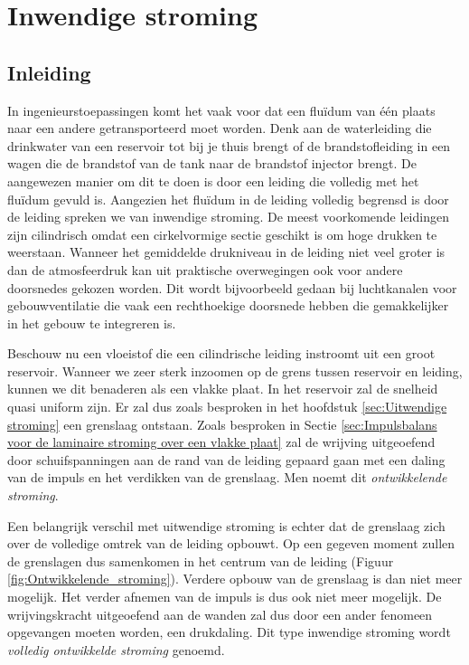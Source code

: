 \chapter{Inwendige stroming}
\label{sec:Inwendige stroming}

	\section{Inleiding}
	\label{sec:Inwendige stroming Inleiding}
In ingenieurstoepassingen komt het vaak voor dat een fluïdum van één plaats naar een andere getransporteerd moet worden. Denk aan de waterleiding die drinkwater van een reservoir tot bij je thuis brengt of de brandstofleiding in een wagen die de brandstof van de tank naar de brandstof injector brengt. De aangewezen manier om dit te doen is door een leiding die volledig met het fluïdum gevuld is. Aangezien het fluïdum in de leiding volledig begrensd is door de leiding spreken we van inwendige stroming. De meest voorkomende leidingen zijn cilindrisch omdat een cirkelvormige sectie geschikt is om hoge drukken te weerstaan. Wanneer het gemiddelde drukniveau in de leiding niet veel groter is dan de atmosfeerdruk kan uit praktische overwegingen ook voor andere doorsnedes gekozen worden. Dit wordt bijvoorbeeld gedaan bij luchtkanalen voor gebouwventilatie die vaak een rechthoekige doorsnede hebben die gemakkelijker in het gebouw te integreren is.

Beschouw nu een vloeistof die een cilindrische leiding instroomt uit een groot reservoir. Wanneer we zeer sterk inzoomen op de grens tussen reservoir en leiding, kunnen we dit benaderen als een vlakke plaat. In het reservoir zal de snelheid quasi uniform zijn. Er zal dus zoals besproken in het hoofdstuk \ref{sec:Uitwendige stroming} een grenslaag ontstaan. Zoals besproken in Sectie \ref{sec:Impulsbalans voor de laminaire stroming over een vlakke plaat} zal de wrijving uitgeoefend door schuifspanningen aan de rand van de leiding gepaard gaan met een daling van de impuls en het verdikken van de grenslaag. Men noemt dit \emph{ontwikkelende stroming}.

Een belangrijk verschil met uitwendige stroming is echter dat de grenslaag zich over de volledige omtrek van de leiding opbouwt. Op een gegeven moment zullen de grenslagen dus samenkomen in het centrum van de leiding (Figuur \ref{fig:Ontwikkelende_stroming}). Verdere opbouw van de grenslaag is dan niet meer mogelijk. Het verder afnemen van de impuls is dus ook niet meer mogelijk. De wrijvingskracht uitgeoefend aan de wanden zal dus door een ander fenomeen opgevangen moeten worden, een drukdaling. Dit type inwendige stroming wordt \emph{volledig ontwikkelde stroming} genoemd.

